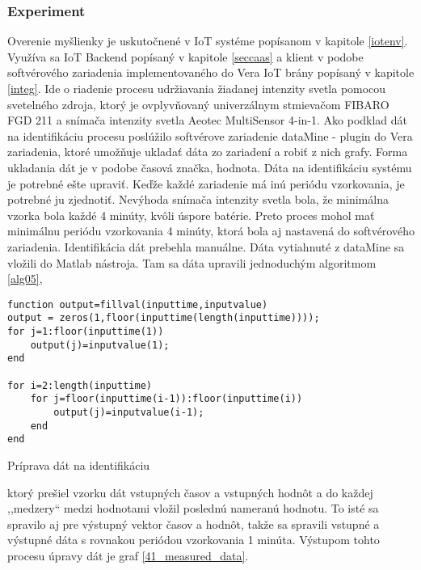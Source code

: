 \subsubsection{Experiment}
Overenie myšlienky je uskutočnené v IoT systéme popísanom v kapitole \ref{iotenv}. Využíva sa IoT Backend popísaný v kapitole   \ref{seccaas} a klient v podobe softvérového zariadenia implementovaného do Vera IoT brány popísaný v kapitole \ref{integ}. Ide o riadenie procesu udržiavania žiadanej intenzity svetla  pomocou svetelného zdroja, ktorý je ovplyvňovaný univerzálnym stmievačom FIBARO FGD 211 a snímača intenzity svetla  Aeotec MultiSensor 4-in-1. Ako podklad dát na identifikáciu procesu poslúžilo softvérove zariadenie dataMine \cite{IOT31} - plugin do Vera zariadenia, ktoré umožňuje ukladať dáta zo zariadení a robiť z nich grafy. Forma ukladania dát je v podobe časová značka, hodnota. Dáta na identifikáciu systému je potrebné ešte upraviť. Keďže každé zariadenie má inú periódu vzorkovania, je potrebné ju zjednotiť. Nevýhoda snímača intenzity svetla bola, že minimálna vzorka bola každé 4 minúty, kvôli úspore batérie. Preto proces mohol mať minimálnu periódu vzorkovania 4 minúty, ktorá bola aj nastavená do softvérového zariadenia. Identifikácia dát prebehla manuálne. Dáta vytiahnuté z dataMine sa vložili do Matlab nástroja. Tam sa dáta upravili jednoduchým algoritmom  \ref{alg05},
\begin{algorithm}
%
\begin{lstlisting}
function output=fillval(inputtime,inputvalue)
output = zeros(1,floor(inputtime(length(inputtime))));
for j=1:floor(inputtime(1))
    output(j)=inputvalue(1);
end

for i=2:length(inputtime)
    for j=floor(inputtime(i-1)):floor(inputtime(i))
        output(j)=inputvalue(i-1);
    end
end
\end{lstlisting}
 \caption{Príprava dát na identifikáciu}
 \label{alg05}
\end{algorithm} 
ktorý prešiel vzorku dát vstupných časov a vstupných hodnôt a do každej ,,medzery`` medzi hodnotami vložil poslednú nameranú hodnotu. To isté sa spravilo aj pre výstupný vektor časov a hodnôt, takže sa spravili vstupné a výstupné dáta s rovnakou periódou vzorkovania 1 minúta. Výstupom tohto procesu úpravy dát je graf \ref{41_measured_data}.
